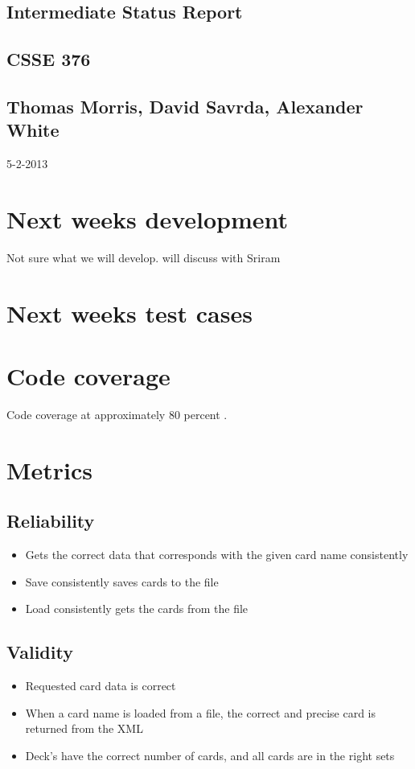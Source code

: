 \documentclass{article}
\begin{document}
	\begin{titlepage}
		\vspace*{\fill}
		\hrulefill
		\begin{center}
			\section*{Intermediate Status Report}
			\subsection*{CSSE 376}
			\subsection*{Thomas Morris, David Savrda, Alexander White}
			5-2-2013
		\end{center}
		\hrulefill
		\vspace*{\fill}
	\end{titlepage}
	\newpage
	\section*{Next weeks development}
		Not sure what we will develop. will discuss with Sriram 
	\section*{Next weeks test cases}
	\section*{Code coverage}
		Code coverage at approximately 80 percent .
	\section*{Metrics}
		\subsection*{Reliability}
			\begin{itemize}
				\item Gets the correct data that corresponds with the given card name consistently
				\item Save consistently saves cards to the file
				\item Load consistently gets the cards from the file
			\end{itemize}
		\subsection*{Validity}
			\begin{itemize}
				\item Requested card data is correct
				\item When a card name is loaded from a file, the correct and precise card is returned from the XML
				\item Deck's have the correct number of cards, and all cards are in the right sets
			\end{itemize}
\end{document}
